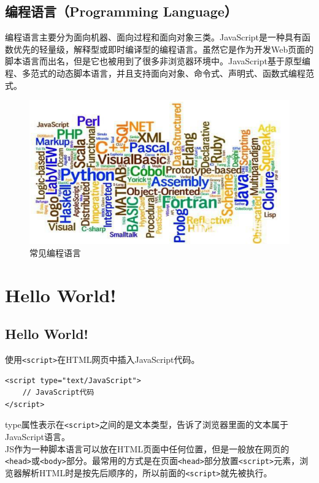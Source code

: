 \subsection{编程语言（Programming Language）}

编程语言主要分为面向机器、面向过程和面向对象三类。JavaScript是一种具有函数优先的轻量级，解释型或即时编译型的编程语言。虽然它是作为开发Web页面的脚本语言而出名，但是它也被用到了很多非浏览器环境中。JavaScript基于原型编程、多范式的动态脚本语言，并且支持面向对象、命令式、声明式、函数式编程范式。

\begin{figure}[H]
	\centering
	\includegraphics[scale=0.9]{img/C9/9-1/1.png}
	\caption{常见编程语言}
\end{figure}

\section{Hello World!}

\subsection{Hello World!}

使用\lstinline|<script>|在HTML网页中插入JavaScript代码。 \\

\begin{lstlisting}[style=htmlcssjs]
<script type="text/JavaScript">
    // JavaScript代码
</script>
\end{lstlisting}

type属性表示在\lstinline|<script>|之间的是文本类型，告诉了浏览器里面的文本属于JavaScript语言。 \\

JS作为一种脚本语言可以放在HTML页面中任何位置，但是一般放在网页的\lstinline|<head>|或\lstinline|<body>|部分。最常用的方式是在页面\lstinline|<head>|部分放置\lstinline|<script>|元素，浏览器解析HTML时是按先后顺序的，所以前面的\lstinline|<script>|就先被执行。 \\

